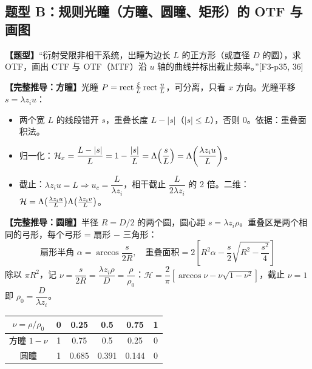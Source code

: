 \subsection*{题型 B：规则光瞳（方瞳、圆瞳、矩形）的 OTF 与画图}\label{sec:typeB}
\textbf{【题型】}“衍射受限非相干系统，出瞳为边长 $L$ 的正方形（或直径 $D$ 的圆），求 OTF，画出 CTF 与 OTF（MTF）沿 $u$ 轴的曲线并标出截止频率。”[F3-p35, 36]

\textbf{【完整推导：方瞳】}光瞳 $P=\operatorname{rect}\frac{\xi}{L}\operatorname{rect}\frac{\eta}{L}$，可分离，只看 $x$ 方向。光瞳平移 $s=\lambda z_iu$：
\begin{itemize}
\item 两个宽 $L$ 的线段错开 $s$，重叠长度 $L-|s|$（$|s|\le L$），否则 0。依据：重叠面积法。
\item 归一化：$\mathcal H_x=\dfrac{L-|s|}{L}=1-\dfrac{|s|}{L}=\Lambda\!\left(\dfrac{s}{L}\right)=\Lambda\!\left(\dfrac{\lambda z_iu}{L}\right)$。
\item 截止：$\lambda z_iu=L\Rightarrow u_c=\dfrac{L}{\lambda z_i}$，相干截止 $\dfrac{L}{2\lambda z_i}$ 的 2 倍。二维：$\mathcal H=\Lambda\big(\frac{\lambda z_iu}{L}\big)\Lambda\big(\frac{\lambda z_iv}{L}\big)$。
\end{itemize}

\textbf{【完整推导：圆瞳】}半径 $R=D/2$ 的两个圆，圆心距 $s=\lambda z_i\rho$。重叠区是两个相同的弓形，每个弓形 = 扇形 $-$ 三角形：
\[
\text{扇形半角 }\alpha=\arccos\frac{s}{2R},\quad
\text{重叠面积}=2\left[R^2\alpha-\frac s2\sqrt{R^2-\frac{s^2}{4}}\right]
\]
除以 $\pi R^2$，记 $\nu=\dfrac{s}{2R}=\dfrac{\lambda z_i\rho}{D}=\dfrac{\rho}{\rho_0}$：$\mathcal H=\dfrac2\pi\left[\arccos\nu-\nu\sqrt{1-\nu^2}\right]$，截止 $\nu=1$ 即 $\rho_0=\dfrac{D}{\lambda z_i}$。

\begin{center}
\renewcommand{\arraystretch}{1.25}
\begin{tabular}{c|ccccc}
$\nu=\rho/\rho_0$ & 0 & 0.25 & 0.5 & 0.75 & 1\\ \hline
方瞳 $1-\nu$ & 1 & 0.75 & 0.5 & 0.25 & 0\\
圆瞳 & 1 & 0.685 & 0.391 & 0.144 & 0
\end{tabular}
\end{center}

